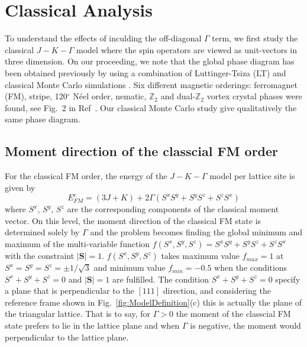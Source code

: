 \documentclass[aps,prb,reprint,amsfonts,amsmath,amssymb,showpacs,groupedaddress,superscriptaddress]{revtex4-1}
\begin{document}
\section{\label{sec:SectionIII}Classical Analysis}
To understand the effects of inculding the off-diagonal $\Gamma$ term, we first study the classical $J-K-\Gamma$ model where the spin operators are viewed as unit-vectors in three dimension. On our proceeding, we note that the global phase diagram has been obtained previously by using a combination of Luttinger-Tsiza (LT) and classical Monte Carlo simulations \cite{PhysRevB.92.165108}. Six different magnetic orderings: ferromagnet (FM), stripe, 120$^\circ$ N\'{e}el order, nematic, $\mathbb{Z}_2$ and dual-$\mathbb{Z}_2$ vortex crystal phases were found, see Fig.~2 in Ref~. Our classical Monte Carlo study give qualitatively the same phase diagram.

\subsection{\label{sec:SectionIIIA}Moment direction of the classcial FM order}
For the classical FM order, the energy of the $J-K-\Gamma$ model per lattice site is given by
\begin{equation}
    E_{FM}^{c} = (3J + K) + 2 \Gamma (S^x S^y + S^y S^z + S^z S^x) \label{eq:EcFM}
\end{equation}
where $S^x$, $S^y$, $S^z$ are the corresponding components of the classical moment vector. On this level, the moment direction of the classical FM state is determined solely by $\Gamma$ and the problem becomes finding the global minimum and maximum of the multi-variable function $f(S^x, S^y, S^z) = S^xS^y + S^yS^z + S^zS^x$ with the constraint $|\bm{S}| = 1$. $f(S^x, S^y, S^z)$ takes maximum value $f_{max}=1$ at $S^x=S^y=S^z=\pm 1/\sqrt{3}$ and minimum value $f_{min}=-0.5$ when the conditions $S^x + S^y + S^z = 0$ and $|\bm{S}| = 1$ are fulfilled. The condition $S^x + S^y + S^z = 0$ specify a plane that is perpendicular to the $[111]$ direction, and considering the reference frame shown in Fig.~\ref{fig:ModelDefinition}(c) this is actually the plane of the triangular lattice. That is to say, for $\Gamma > 0$ the moment of the classcial FM state prefers to lie in the lattice plane and when $\Gamma$ is negative, the moment would perpendicular to the lattice plane.
\end{document}
